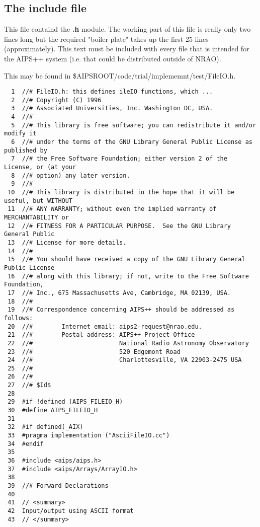\newpage
\subsection{The {\bf include} file}

	This file containd the {\bf .h} module. 	The working part of
this file is really only two lines long but the required
"boiler-plate" takes up the first 25 lines (approximately). This text
must be included with every file that is intended for the AIPS++
system (i.e. that could be distributed outside of NRAO).  



\newpage

This 
may be found in \$AIPSROOT/code/trial/implememnt/test/FileIO.h.
\begin{verbatim}
  1  //# FileIO.h: this defines ileIO functions, which ...
  2  //# Copyright (C) 1996
  3  //# Associated Universities, Inc. Washington DC, USA.
  4  //#
  5  //# This library is free software; you can redistribute it and/or modify it
  6  //# under the terms of the GNU Library General Public License as published by
  7  //# the Free Software Foundation; either version 2 of the License, or (at your
  8  //# option) any later version.
  9  //#
 10  //# This library is distributed in the hope that it will be useful, but WITHOUT
 11  //# ANY WARRANTY; without even the implied warranty of MERCHANTABILITY or
 12  //# FITNESS FOR A PARTICULAR PURPOSE.  See the GNU Library General Public
 13  //# License for more details.
 14  //#
 15  //# You should have received a copy of the GNU Library General Public License
 16  //# along with this library; if not, write to the Free Software Foundation,
 17  //# Inc., 675 Massachusetts Ave, Cambridge, MA 02139, USA.
 18  //#
 19  //# Correspondence concerning AIPS++ should be addressed as follows:
 20  //#        Internet email: aips2-request@nrao.edu.
 21  //#        Postal address: AIPS++ Project Office
 22  //#                        National Radio Astronomy Observatory
 23  //#                        520 Edgemont Road
 24  //#                        Charlottesville, VA 22903-2475 USA
 25  //#
 26  //#
 27  //# $Id$
 28
 29  #if !defined (AIPS_FILEIO_H)
 30  #define AIPS_FILEIO_H
 31
 32  #if defined(_AIX)
 33  #pragma implementation ("AsciiFileIO.cc")
 34  #endif
 35
 36  #include <aips/aips.h>
 37  #include <aips/Arrays/ArrayIO.h>
 38
 39  //# Forward Declarations
 40
 41  // <summary>
 42  Input/output using ASCII format
 43  // </summary>

\end{verbatim}
